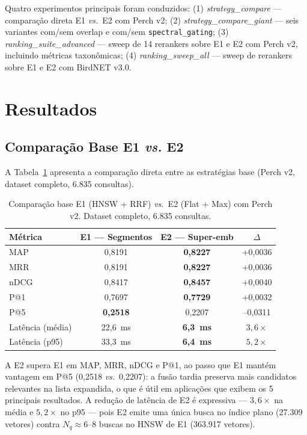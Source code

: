 \documentclass[12pt]{article}
\begin{document}
Quatro experimentos principais foram conduzidos: (1) \textit{strategy\_compare}
--- comparação direta E1 \textit{vs.}\ E2 com Perch v2; (2)
\textit{strategy\_compare\_giant} --- seis variantes com/sem overlap e com/sem
\texttt{spectral\_gating}; (3) \textit{ranking\_suite\_advanced} --- sweep de
14 rerankers sobre E1 e E2 com Perch v2, incluindo métricas taxonômicas; (4)
\textit{ranking\_sweep\_all} --- sweep de rerankers sobre E1 e E2 com BirdNET v3.0.

\section{Resultados}
\label{sec:res}

\subsection{Comparação Base E1 \textit{vs.} E2}

A Tabela~\ref{tab:base} apresenta a comparação direta entre as estratégias
base (Perch v2, dataset completo, 6.835 consultas).

\begin{table}[H]
\centering
\caption{Comparação base E1 (HNSW + RRF) \textit{vs.}\ E2 (Flat + Max) com
Perch v2. Dataset completo, 6.835 consultas.}
\label{tab:base}
\begin{tabular}{lccc}
\toprule
\textbf{Métrica} & \textbf{E1 --- Segmentos} & \textbf{E2 --- Super-emb} & \textbf{$\Delta$} \\
\midrule
MAP              & 0,8191 & \textbf{0,8227} & +0,0036 \\
MRR              & 0,8191 & \textbf{0,8227} & +0,0036 \\
nDCG             & 0,8417 & \textbf{0,8457} & +0,0040 \\
P@1              & 0,7697 & \textbf{0,7729} & +0,0032 \\
P@5              & \textbf{0,2518} & 0,2207  & --0,0311 \\
Latência (média) & 22,6~ms & \textbf{6,3~ms} & $3{,}6\times$ \\
Latência (p95)   & 33,3~ms & \textbf{6,4~ms} & $5{,}2\times$ \\
\bottomrule
\end{tabular}
\end{table}

A E2 supera E1 em MAP, MRR, nDCG e P@1, ao passo que E1 mantém vantagem
em P@5 (0,2518 \textit{vs.}\ 0,2207): a fusão tardia preserva mais candidatos
relevantes na lista expandida, o que é útil em aplicações que exibem os
5 principais resultados. A redução de latência de E2 é expressiva ---
$3{,}6\times$ na média e $5{,}2\times$ no p95 --- pois E2 emite uma única
busca no índice plano (27.309 vetores) contra $N_q \approx 6$--$8$ buscas
no HNSW de E1 (363.917 vetores).
\end{document}
